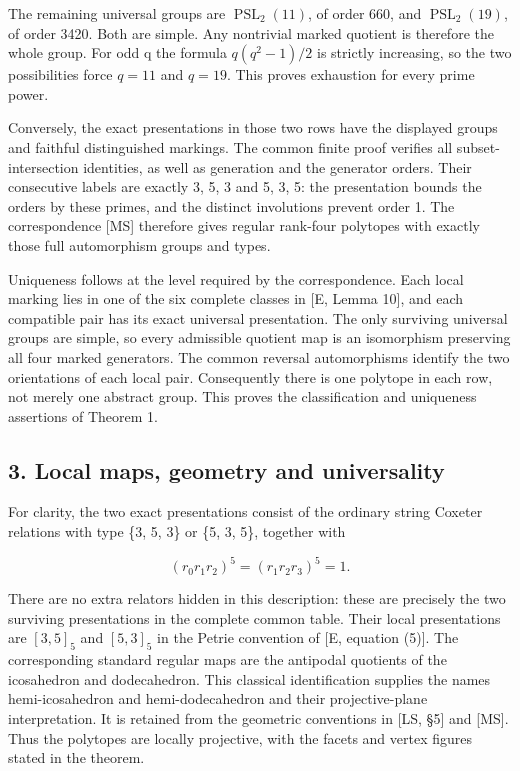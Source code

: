 \documentclass[
  11pt,
  a4paper,
]{article}
\begin{document}
The remaining universal groups are \(\operatorname{PSL}_2(11)\), of
order 660, and \(\operatorname{PSL}_2(19)\), of order 3420. Both are
simple. Any nontrivial marked quotient is therefore the whole group. For
odd q the formula \(q(q^2-1)/2\) is strictly increasing, so the two
possibilities force \(q=11\) and \(q=19\). This proves exhaustion for
every prime power.

Conversely, the exact presentations in those two rows have the displayed
groups and faithful distinguished markings. The common finite proof
verifies all subset-intersection identities, as well as generation and
the generator orders. Their consecutive labels are exactly 3, 5, 3 and
5, 3, 5: the presentation bounds the orders by these primes, and the
distinct involutions prevent order 1. The correspondence {[}MS{]}
therefore gives regular rank-four polytopes with exactly those full
automorphism groups and types.

Uniqueness follows at the level required by the correspondence. Each
local marking lies in one of the six complete classes in {[}E, Lemma
10{]}, and each compatible pair has its exact universal presentation.
The only surviving universal groups are simple, so every admissible
quotient map is an isomorphism preserving all four marked generators.
The common reversal automorphisms identify the two orientations of each
local pair. Consequently there is one polytope in each row, not merely
one abstract group. This proves the classification and uniqueness
assertions of Theorem 1.

\subsection{3. Local maps, geometry and
universality}\label{local-maps-geometry-and-universality}

For clarity, the two exact presentations consist of the ordinary string
Coxeter relations with type \{3, 5, 3\} or \{5, 3, 5\}, together with

\[
 (r_0r_1r_2)^5=(r_1r_2r_3)^5=1.
 \tag{2}
\]

There are no extra relators hidden in this description: these are
precisely the two surviving presentations in the complete common table.
Their local presentations are \([3,5]_5\) and \([5,3]_5\) in the Petrie
convention of {[}E, equation (5){]}. The corresponding standard regular
maps are the antipodal quotients of the icosahedron and dodecahedron.
This classical identification supplies the names hemi-icosahedron and
hemi-dodecahedron and their projective-plane interpretation. It is
retained from the geometric conventions in {[}LS, §5{]} and {[}MS{]}.
Thus the polytopes are locally projective, with the facets and vertex
figures stated in the theorem.
\end{document}
